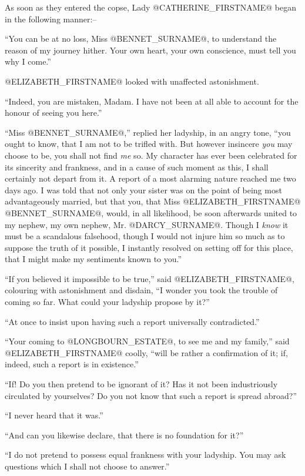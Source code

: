 As soon as they entered the copse, Lady @CATHERINE_FIRSTNAME@ began in the following
manner:--

``You can be at no loss, Miss @BENNET_SURNAME@, to understand the reason of my
journey hither. Your own heart, your own conscience, must tell you why I
come.''

@ELIZABETH_FIRSTNAME@ looked with unaffected astonishment.

``Indeed, you are mistaken, Madam. I have not been at all able to account
for the honour of seeing you here.''

``Miss @BENNET_SURNAME@,'' replied her ladyship, in an angry tone, ``you ought to
know, that I am not to be trifled with. But however insincere \textit{you} may
choose to be, you shall not find \textit{me} so. My character has ever been
celebrated for its sincerity and frankness, and in a cause of such
moment as this, I shall certainly not depart from it. A report of a most
alarming nature reached me two days ago. I was told that not only your
sister was on the point of being most advantageously married, but that
you, that Miss @ELIZABETH_FIRSTNAME@ @BENNET_SURNAME@, would, in all likelihood, be soon
afterwards united to my nephew, my own nephew, Mr. @DARCY_SURNAME@. Though I
\textit{know} it must be a scandalous falsehood, though I would not injure him
so much as to suppose the truth of it possible, I instantly resolved
on setting off for this place, that I might make my sentiments known to
you.''

``If you believed it impossible to be true,'' said @ELIZABETH_FIRSTNAME@, colouring
with astonishment and disdain, ``I wonder you took the trouble of coming
so far. What could your ladyship propose by it?''

``At once to insist upon having such a report universally contradicted.''

``Your coming to @LONGBOURN_ESTATE@, to see me and my family,'' said @ELIZABETH_FIRSTNAME@
coolly, ``will be rather a confirmation of it; if, indeed, such a report
is in existence.''

``If! Do you then pretend to be ignorant of it? Has it not been
industriously circulated by yourselves? Do you not know that such a
report is spread abroad?''

``I never heard that it was.''

``And can you likewise declare, that there is no foundation for it?''

``I do not pretend to possess equal frankness with your ladyship. You may
ask questions which I shall not choose to answer.''

